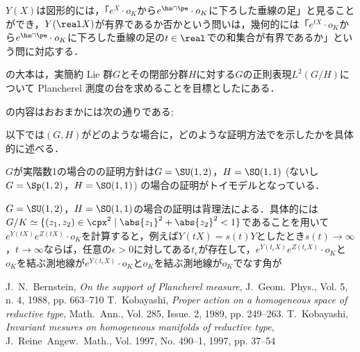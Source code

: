 \documentclass[12pt,dvipdfmx,uplatex]{jsarticle}
\begin{document}
$Y(X)$は図形的には，「$e^{X}\cdot o_K$から$e^{\ha\cap\pe}\cdot o_K $に下ろした垂線の足」と見ることができ，$Y(\real X) $が有界であるか否かという問いは，幾何的には「$e^{tX}\cdot o_K$から$e^{\ha\cap\pe}\cdot o_K $に下ろした垂線の足の$t\in \real$での和集合が有界であるか」という問に対応する．

の大本は，実簡約 Lie 群$G$とその閉部分群$H$に対する$G$の正則表現$L^2(G/H)$について Plancherel 測度の台を求めることを目標とした\cite{ber88}にある．

\cite{ber88}の内容はおおまかには次の通りである; 


以下では$(G,H) $がどのような場合に，どのような証明方法でを示したかを具体的に述べる．

$G$が実階数1の場合のの証明方針は$G = \SU(1,2) $，$H= \SO(1,1)$ (ないし$G = \Sp(1,2) $，$H = \SO(1,1) $) の場合の証明がトイモデルとなっている．

$G = \SU(1,2) $，$H= \SO(1,1)$の場合の証明は背理法による．具体的には$G/K \simeq \{(z_1,z_2)\in \cpx^2 \mid \abs{z_1}^2 + \abs{z_2}^2 < 1 \} $であることを用いて$e^{Y(tX)}e^{Z(tX)}\cdot o_K $を計算すると，例えば$Y(t X) = s(t) Y $としたとき$s(t) \to \infty$，$t\to \infty $ならば，任意の$\epsilon > 0$に対してある$t_{\epsilon}$が存在して，$e^{Y(t_{\epsilon} X)}e^{Z(t_{\epsilon} X)}\cdot o_K $と$o_K$を結ぶ測地線が$e^{Y(t_{\epsilon} X)}\cdot o_K $と$o_K$を結ぶ測地線が$o_K$でなす角が

\begin{thebibliography}{99}
 J.~N.~Bernstein, \textit{On the support of Plancherel measure}, J.~Geom.~Phys., Vol. 5, n. 4, 1988, pp. 663--710
 T.~Kobayashi, 
  \textit{Proper action on a homogeneous space of reductive type},
  Math.~Ann., Vol. 285, Issue. 2, 1989, pp. 249--263.  
 T.~Kobayashi, \textit{Invariant mesures on homogeneous manifolds of reductive type}, J.~Reine~Angew.~Math., Vol. 1997, No. 490--1, 1997, pp. 37--54

\end{thebibliography}
\end{document}
